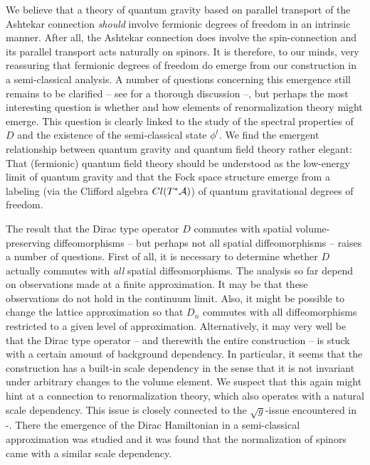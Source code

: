 \documentclass[12pt]{article}
\def\ca{{\cal A}}
\begin{document}
We believe that a theory of quantum gravity based on parallel transport of the Ashtekar connection {\it should} involve fermionic degrees of freedom in an intrinsic manner. After all, the Ashtekar connection does involve the spin-connection and its parallel transport acts naturally on spinors. It is therefore, to our minds, very reassuring that fermionic degrees of freedom do emerge from our construction in a semi-classical analysis.
A number of questions concerning this emergence still remains to be clarified -- see \cite{Aastrup:2011dt} for a thorough discussion --, but perhaps the most interesting question is whether and how elements of renormalization theory might emerge. This question is clearly linked to the study of the spectral properties of $D$ and the existence of the semi-classical state $\phi^t$. 
We find the emergent relationship between quantum gravity and quantum field theory rather elegant: That (fermionic) quantum field theory should be understood as the low-energy limit of quantum gravity and that the Fock space structure emerge from a labeling (via the Clifford algebra $Cl(T^*\ca)$) of quantum gravitational degrees of freedom. %




The result that the Dirac type operator $D$ commutes with spatial volume-preserving diffeomorphisms -- but perhaps not all spatial diffeomorphisms -- raises a number of questions. First of all, it is necessary to determine whether $D$ actually commutes with {\it all} spatial diffeomorphisms. The analysis so far depend on observations made at a finite approximation. It may be that these observations do not hold in the continuum limit. Also, it might be possible to change the lattice approximation so that $D_n$ commutes with all diffeomorphisms restricted to a given level of approximation. 
Alternatively, it may very well be that the Dirac type operator -- and therewith the entire construction -- is stuck with a certain amount of background dependency. In particular, it seems that the construction has a built-in scale dependency in the sense that it is not invariant under arbitrary changes to the volume element. We suspect that this again might hint at a connection to renormalization theory, which also operates with a natural scale dependency. This issue is closely connected to the $\sqrt{g}$-issue encountered in \cite{AGNP1}-\cite{Aastrup:2011dt}. There the emergence of the Dirac Hamiltonian in a semi-classical approximation was studied and it was found that the normalization of spinors came with a similar scale dependency.  
\end{document}
